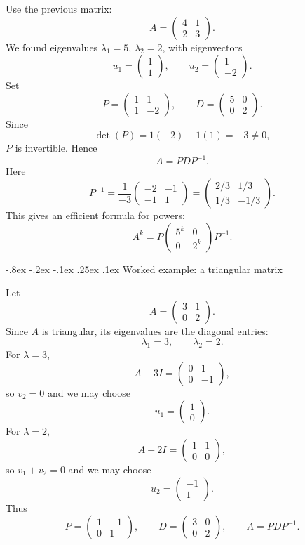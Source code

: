 \documentclass[10pt]{article}
\makeatletter
\renewcommand\subsubsection{\@startsection{subsubsection}{3}{\z@}%
  {-.8ex \@plus -.2ex \@minus -.1ex}%
  {.25ex \@plus .1ex}%
  {\normalfont\normalsize\bfseries\itshape}}
\theoremstyle{compactdefinition}
\theoremstyle{compactproposition}
\makeatother
\begin{document}
Use the previous matrix:
\[
A=
\begin{pmatrix}
4&1\\
2&3
\end{pmatrix}.
\]
We found eigenvalues $\lambda_1=5$, $\lambda_2=2$, with eigenvectors
\[
u_1=\begin{pmatrix}1\\1\end{pmatrix},
\qquad
u_2=\begin{pmatrix}1\\-2\end{pmatrix}.
\]
Set
\[
P=
\begin{pmatrix}
1&1\\
1&-2
\end{pmatrix},
\qquad
D=
\begin{pmatrix}
5&0\\
0&2
\end{pmatrix}.
\]
Since
\[
\det(P)=1(-2)-1(1)=-3\neq0,
\]
$P$ is invertible. Hence
\[
A=PDP^{-1}.
\]
Here
\[
P^{-1}
=
\frac{1}{-3}
\begin{pmatrix}
-2&-1\\
-1&1
\end{pmatrix}
=
\begin{pmatrix}
2/3&1/3\\
1/3&-1/3
\end{pmatrix}.
\]
This gives an efficient formula for powers:
\[
A^k
=
P
\begin{pmatrix}
5^k&0\\
0&2^k
\end{pmatrix}
P^{-1}.
\]

\subsubsection{Worked example: a triangular matrix}

Let
\[
A=
\begin{pmatrix}
3&1\\
0&2
\end{pmatrix}.
\]
Since $A$ is triangular, its eigenvalues are the diagonal entries:
\[
\lambda_1=3,
\qquad
\lambda_2=2.
\]
For $\lambda=3$,
\[
A-3I=
\begin{pmatrix}
0&1\\
0&-1
\end{pmatrix},
\]
so $v_2=0$ and we may choose
\[
u_1=\begin{pmatrix}1\\0\end{pmatrix}.
\]
For $\lambda=2$,
\[
A-2I=
\begin{pmatrix}
1&1\\
0&0
\end{pmatrix},
\]
so $v_1+v_2=0$ and we may choose
\[
u_2=\begin{pmatrix}-1\\1\end{pmatrix}.
\]
Thus
\[
P=\begin{pmatrix}1&-1\\0&1\end{pmatrix},
\qquad
D=\begin{pmatrix}3&0\\0&2\end{pmatrix},
\qquad
A=PDP^{-1}.
\]
\end{document}
